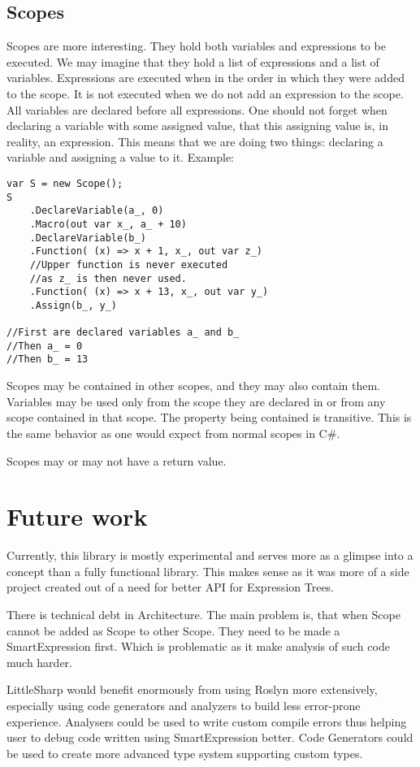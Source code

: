 \subsection{Scopes}
Scopes are more interesting. They hold both variables and expressions to be executed. We may imagine that they hold a list of expressions and a list of variables. Expressions are executed when in the order in which they were added to the scope. It is not executed when we do not add an expression to the scope. All variables are declared before all expressions. One should not forget when declaring a variable with some assigned value, that this assigning value is, in reality, an expression. This means that we are doing two things: declaring a variable and assigning a value to it. Example: 
\begin{lstlisting}
var S = new Scope();
S
    .DeclareVariable(a_, 0)
    .Macro(out var x_, a_ + 10)
    .DeclareVariable(b_)
    .Function( (x) => x + 1, x_, out var z_)
    //Upper function is never executed
    //as z_ is then never used.
    .Function( (x) => x + 13, x_, out var y_)
    .Assign(b_, y_)

//First are declared variables a_ and b_
//Then a_ = 0
//Then b_ = 13
\end{lstlisting}

Scopes may be contained in other scopes, and they may also contain them. Variables may be used only from the scope they are declared in or from any scope contained in that scope. The property being contained is transitive. This is the same behavior as one would expect from normal scopes in C\#.

Scopes may or may not have a return value. 


\section{Future work}
Currently, this library is mostly experimental and serves more as a glimpse into a concept than a fully functional library. This makes sense as it was more of a side project created out of a need for better API for Expression Trees. 

There is technical debt in Architecture. The main problem is, that when Scope cannot be added as Scope to other Scope. They need to be made a SmartExpression first. Which is problematic as it make analysis of such code much harder.

LittleSharp would benefit enormously from using Roslyn more extensively, especially using code generators and analyzers to build less error-prone experience. Analysers could be used to write custom compile errors thus helping user to debug code written using SmartExpression better. Code Generators could be used to create more advanced type system supporting custom types.

